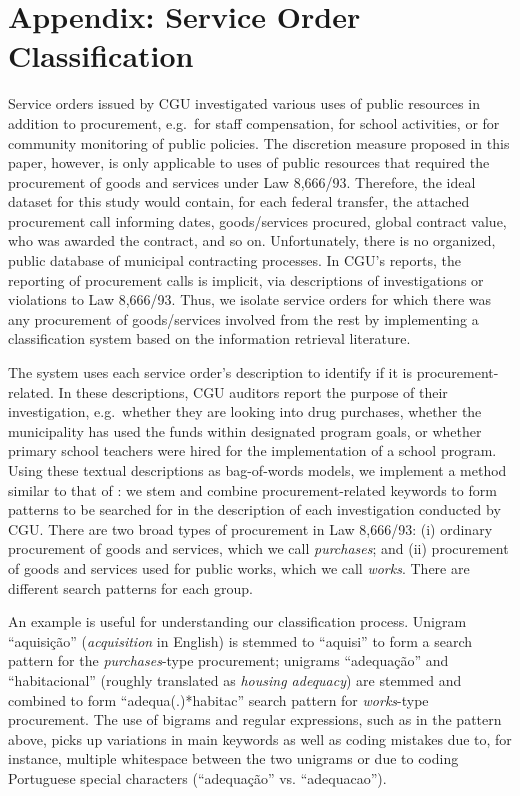 \documentclass[11pt]{article}
\begin{document}
\clearpage

\appendix

\section{Appendix: Service Order Classification} \label{sec:appendixA}

Service orders issued by CGU investigated various uses of public resources in addition to procurement, e.g.~for staff compensation, for school activities, or for community monitoring of public policies. The discretion measure proposed in this paper, however, is only applicable to uses of public resources that required the procurement of goods and services under Law 8,666/93. Therefore, the ideal dataset for this study would contain, for each federal transfer, the attached procurement call informing dates, goods/services procured, global contract value, who was awarded the contract, and so on. Unfortunately, there is no organized, public database of municipal contracting processes. In CGU's reports, the reporting of procurement calls is implicit, via descriptions of investigations or violations to Law 8,666/93. Thus, we isolate service orders for which there was any procurement of goods/services involved from the rest by implementing a classification system based on the information retrieval literature.

The system uses each service order's description to identify if it is procurement-related. In these descriptions, CGU auditors report the purpose of their investigation, e.g.~whether they are looking into drug purchases, whether the municipality has used the funds within designated program goals, or whether primary school teachers were hired for the implementation of a school program. Using these textual descriptions as bag-of-words models, we implement a method similar to that of \citet{HopkinsMethodAutomatedNonparametric2009}: we stem and combine procurement-related keywords to form patterns to be searched for in the description of each investigation conducted by CGU. There are two broad types of procurement in Law 8,666/93: (i) ordinary procurement of goods and services, which we call \emph{purchases}; and (ii) procurement of goods and services used for public works, which we call \emph{works}. There are different search patterns for each group.

An example is useful for understanding our classification process. Unigram ``aquisição'' (\emph{acquisition} in English) is stemmed to ``aquisi'' to form a search pattern for the \emph{purchases}-type procurement; unigrams ``adequação'' and ``habitacional'' (roughly translated as \emph{housing adequacy}) are stemmed and combined to form ``adequa(.)*habitac'' search pattern for \emph{works}-type procurement. The use of bigrams and regular expressions, such as in the pattern above, picks up variations in main keywords as well as coding mistakes due to, for instance, multiple whitespace between the two unigrams or due to coding Portuguese special characters (``adequação'' vs. ``adequacao'').
\end{document}
